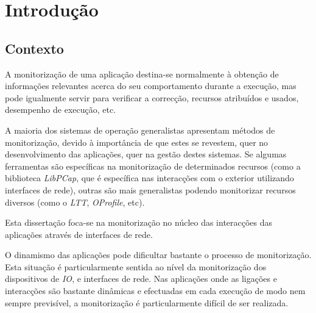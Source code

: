 \chapter{Introdução}\label{cap:introducao}

\section{Contexto}
\label{sec:intro_context}
A monitorização de uma aplicação destina-se normalmente à obtenção de informações relevantes acerca do seu comportamento durante a execução, mas pode igualmente servir para verificar a correcção, recursos atribuídos e usados, desempenho de execução, etc.

A maioria dos sistemas de operação generalistas apresentam métodos de monitorização, devido à importância de que estes se revestem, quer no desenvolvimento das aplicações, quer na gestão destes sistemas.
Se algumas ferramentas são específicas na monitorização de determinados recursos (como a biblioteca \textit{LibPCap}, que é específica nas interacções com o exterior utilizando interfaces de rede), outras são mais generalistas podendo monitorizar recursos diversos (como o \textit{LTT}, \textit{OProfile}, etc).

Esta dissertação foca-se na monitorização no núcleo das interacções das aplicações através de interfaces de rede.

O dinamismo das aplicações pode dificultar bastante o processo de monitorização.
Esta situação é particularmente sentida ao nível da monitorização dos dispositivos de \textit{IO}, e interfaces de rede.
Nas aplicações onde as ligações e interacções são bastante dinâmicas e efectuadas em cada execução de modo nem sempre previsível, a monitorização é particularmente difícil de ser realizada.

